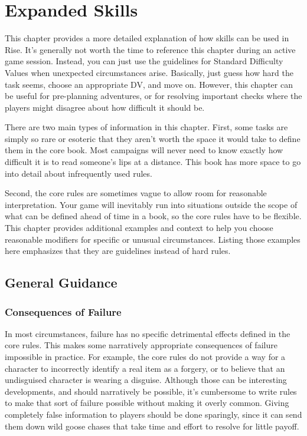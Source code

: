 \chapter{Expanded Skills}

This chapter provides a more detailed explanation of how skills can be used in Rise.
It's generally not worth the time to reference this chapter during an active game session.
Instead, you can just use the guidelines for Standard Difficulty Values when unexpected circumstances arise.
Basically, just guess how hard the task seems, choose an appropriate DV, and move on.
However, this chapter can be useful for pre-planning adventures, or for resolving important checks where the players might disagree about how difficult it should be.

There are two main types of information in this chapter.
First, some tasks are simply so rare or esoteric that they aren't worth the space it would take to define them in the core book.
Most campaigns will never need to know exactly how difficult it is to read someone's lips at a distance.
This book has more space to go into detail about infrequently used rules.

Second, the core rules are sometimes vague to allow room for reasonable interpretation.
Your game will inevitably run into situations outside the scope of what can be defined ahead of time in a book, so the core rules have to be flexible.
This chapter provides additional examples and context to help you choose reasonable modifiers for specific or unusual circumstances.
Listing those examples here emphasizes that they are guidelines instead of hard rules.

\section{General Guidance}

    \subsection{Consequences of Failure}
        In most circumstances, failure has no specific detrimental effects defined in the core rules.
        This makes some narratively appropriate consequences of failure impossible in practice.
        For example, the core rules do not provide a way for a character to incorrectly identify a real item as a forgery, or to believe that an undisguised character is wearing a disguise.
        Although those can be interesting developments, and should narratively be possible, it's cumbersome to write rules to make that sort of failure possible without making it overly common.
        Giving completely false information to players should be done sparingly, since it can send them down wild goose chases that take time and effort to resolve for little payoff.

